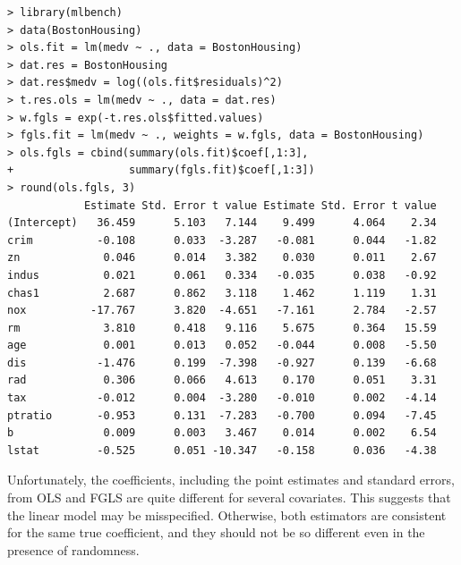 \begin{lstlisting}
> library(mlbench)
> data(BostonHousing)
> ols.fit = lm(medv ~ ., data = BostonHousing)
> dat.res = BostonHousing
> dat.res$medv = log((ols.fit$residuals)^2)
> t.res.ols = lm(medv ~ ., data = dat.res)
> w.fgls = exp(-t.res.ols$fitted.values)
> fgls.fit = lm(medv ~ ., weights = w.fgls, data = BostonHousing)
> ols.fgls = cbind(summary(ols.fit)$coef[,1:3], 
+                  summary(fgls.fit)$coef[,1:3])
> round(ols.fgls, 3)
            Estimate Std. Error t value Estimate Std. Error t value
(Intercept)   36.459      5.103   7.144    9.499      4.064    2.34
crim          -0.108      0.033  -3.287   -0.081      0.044   -1.82
zn             0.046      0.014   3.382    0.030      0.011    2.67
indus          0.021      0.061   0.334   -0.035      0.038   -0.92
chas1          2.687      0.862   3.118    1.462      1.119    1.31
nox          -17.767      3.820  -4.651   -7.161      2.784   -2.57
rm             3.810      0.418   9.116    5.675      0.364   15.59
age            0.001      0.013   0.052   -0.044      0.008   -5.50
dis           -1.476      0.199  -7.398   -0.927      0.139   -6.68
rad            0.306      0.066   4.613    0.170      0.051    3.31
tax           -0.012      0.004  -3.280   -0.010      0.002   -4.14
ptratio       -0.953      0.131  -7.283   -0.700      0.094   -7.45
b              0.009      0.003   3.467    0.014      0.002    6.54
lstat         -0.525      0.051 -10.347   -0.158      0.036   -4.38
\end{lstlisting}

Unfortunately, the coefficients, including the point estimates and standard errors, from OLS and FGLS are quite different for several covariates. This suggests that the linear model may be misspecified. Otherwise, both estimators are consistent for the same true coefficient, and they should not be so different even in the presence of randomness. 



